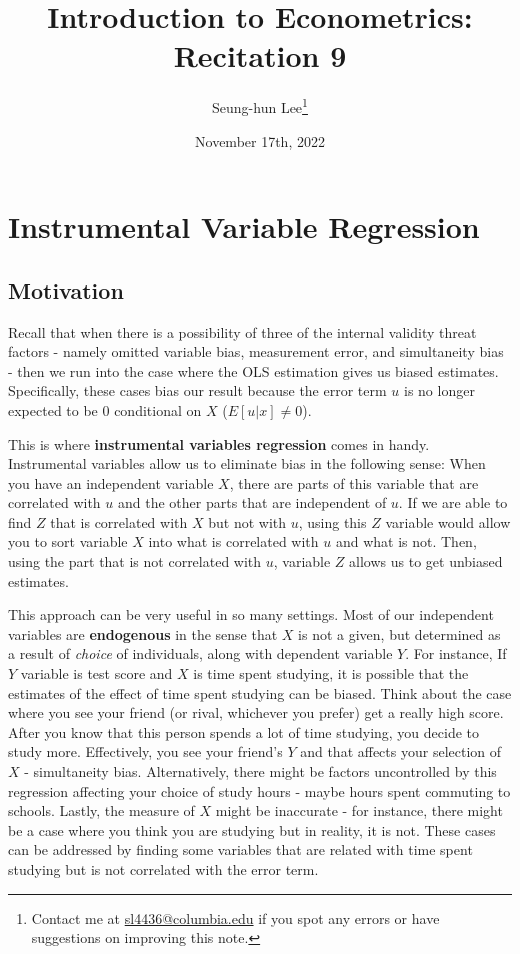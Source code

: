 \documentclass[12pt]{article}
\title{Introduction to Econometrics: Recitation 9}
\theoremstyle{definition}
\theoremstyle{property}
\theoremstyle{assumption}
\theoremstyle{example}
\theoremstyle{comment}
\begin{document}
\linespread{1.25}
\onehalfspacing

\author{Seung-hun Lee\footnote{Contact me at \href{mailto:sl4436@columbia.edu}{sl4436@columbia.edu} if you spot any errors or have suggestions on improving this note.}}
\date{November 17th, 2022}
\maketitle
\thispagestyle{firstpage}

\section{Instrumental Variable Regression}
\subsection{Motivation}
Recall that when there is a possibility of three of the internal validity threat factors - namely omitted variable bias, measurement error, and simultaneity bias - then we run into the case where the OLS estimation gives us biased estimates. Specifically, these cases bias our result because the error term $u$ is no longer expected to be 0 conditional on $X$ ($E[u|x]\neq 0$). \par\medskip

This is where \textbf{instrumental variables regression} comes in handy. Instrumental variables allow us to eliminate bias in the following sense: When you have an independent variable $X$, there are parts of this variable that are correlated with $u$ and the other parts that are independent of $u$. If we are able to find $Z$ that is correlated with $X$ but not with $u$, using this $Z$ variable would allow you to sort variable $X$ into what is correlated with $u$ and what is not. Then, using the part that is not correlated with $u$, variable $Z$ allows us to get unbiased estimates. \par\medskip

This approach can be very useful in so many settings. Most of our independent variables are \textbf{endogenous} in the sense that $X$ is not a given, but determined as a result of \textit{choice} of individuals, along with dependent variable $Y$. For instance, If $Y$ variable is test score and $X$ is time spent studying, it is possible that the estimates of the effect of time spent studying can be biased. Think about the case where you see your friend (or rival, whichever you prefer) get a really high score. After you know that this person spends a lot of time studying, you decide to study more. Effectively, you see your friend's $Y$ and that affects your selection of $X$ - simultaneity bias. Alternatively, there might be factors uncontrolled by this regression affecting your choice of study hours  - maybe hours spent commuting to schools. Lastly, the measure of $X$ might be inaccurate - for instance, there might be a case where you think you are studying but in reality, it is not. These cases can be addressed by finding some variables that are related with time spent studying but is not correlated with the error term. 
\end{document}

